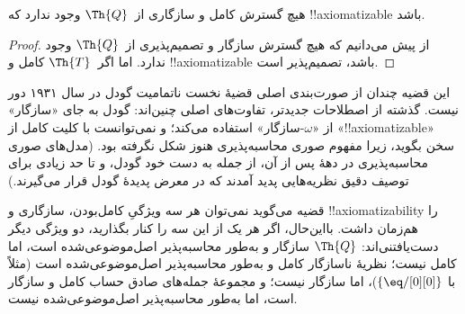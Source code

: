 \documentclass[../../../include/open-logic-section]{subfiles}
\begin{document}


\begin{thm}
هیچ گسترش کامل و سازگاری از~$\Th{Q}$ وجود ندارد که
!!{axiomatizable} باشد.
\end{thm}

\begin{proof}
از پیش می‌دانیم که هیچ گسترش سازگار و تصمیم‌پذیری از~$\Th{Q}$ وجود
ندارد. اما اگر~$\Th{T}$ کامل و !!{axiomatizable} باشد، تصمیم‌پذیر است.
\end{proof}

\begin{explain}
این قضیه چندان از صورت‌بندی اصلی قضیهٔ نخست ناتمامیت گودل در سال ۱۹۳۱
دور نیست. گذشته از اصطلاحات جدیدتر، تفاوت‌های اصلی چنین‌اند: گودل به
جای «سازگار» از «$\omega$-سازگار» استفاده می‌کند؛ و نمی‌توانست با
کلیت کامل از «!!{axiomatizable}» سخن بگوید، زیرا مفهوم صوری
محاسبه‌پذیری هنوز شکل نگرفته بود. (مدل‌های صوری محاسبه‌پذیری در دههٔ
پس از آن، از جمله به دست خود گودل، و تا حد زیادی برای توصیف دقیق
نظریه‌هایی پدید آمدند که در معرض پدیدهٔ گودل قرار می‌گیرند.)

قضیه می‌گوید نمی‌توان هر سه ویژگیِ کامل‌بودن، سازگاری و
!!{axiomatizability} را هم‌زمان داشت. بااین‌حال، اگر هر یک از این سه
را کنار بگذارید، دو ویژگی دیگر دست‌یافتنی‌اند: $\Th{Q}$ سازگار و به‌طور
محاسبه‌پذیر اصل‌موضوعی‌شده است، اما کامل نیست؛ نظریهٔ ناسازگار کامل و
به‌طور محاسبه‌پذیر اصل‌موضوعی‌شده است (مثلاً با
$\{ \eq/[0][0] \}$)، اما سازگار نیست؛ و مجموعهٔ جمله‌های صادق حساب کامل
و سازگار است، اما به‌طور محاسبه‌پذیر اصل‌موضوعی‌شده نیست.
\end{explain}
\end{document}
